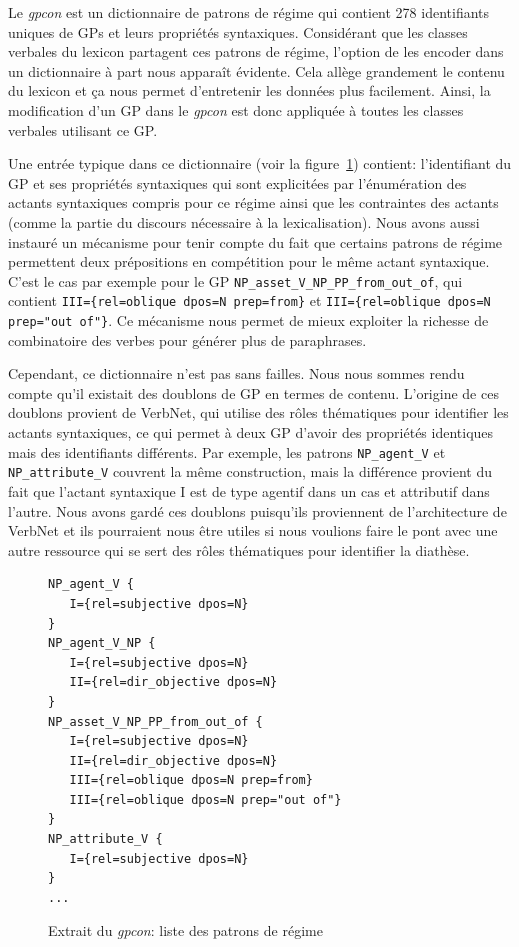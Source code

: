 Le \emph{gpcon} est un dictionnaire de patrons de régime qui contient 278 identifiants uniques de \acp{GP} et leurs propriétés syntaxiques. Considérant que les classes verbales du lexicon partagent ces patrons de régime, l'option de les encoder dans un dictionnaire à part nous apparaît évidente. Cela allège grandement le contenu du lexicon et ça nous permet d'entretenir les données plus facilement. Ainsi, la modification d'un \ac{GP} dans le \emph{gpcon} est donc appliquée à toutes les classes verbales utilisant ce \ac{GP}. 

Une entrée typique dans ce dictionnaire (voir la figure~\ref{fig:4entries-gpcon}) contient: l'identifiant du \ac{GP} et ses propriétés syntaxiques qui sont explicitées par l'énumération des actants syntaxiques compris pour ce régime ainsi que les contraintes des actants (comme la partie du discours nécessaire à la lexicalisation). Nous avons aussi instauré un mécanisme pour tenir compte du fait que certains patrons de régime permettent deux prépositions en compétition pour le même actant syntaxique. C'est le cas par exemple pour le \ac{GP} \texttt{NP\_asset\_V\_NP\_PP\_from\_out\_of}, qui contient \lstinline|III={rel=oblique dpos=N prep=from}| et \lstinline|III={rel=oblique dpos=N prep="out of"}|. Ce mécanisme nous permet de mieux exploiter la richesse de combinatoire des verbes pour générer plus de paraphrases.

Cependant, ce dictionnaire n'est pas sans failles. Nous nous sommes rendu compte qu'il existait des doublons de \ac{GP} en termes de contenu. L'origine de ces doublons provient de VerbNet, qui utilise des rôles thématiques pour identifier les actants syntaxiques, ce qui permet à deux \ac{GP} d'avoir des propriétés identiques mais des identifiants différents. Par exemple, les patrons \texttt{NP\_agent\_V} et \texttt{NP\_attribute\_V} couvrent la même construction, mais la différence provient du fait que l'actant syntaxique I est de type agentif dans un cas et attributif dans l'autre. Nous avons gardé ces doublons puisqu'ils proviennent de l'architecture de VerbNet et ils pourraient nous être utiles si nous voulions faire le pont avec une autre ressource qui se sert des rôles thématiques pour identifier la diathèse.

\begin{figure}[htb]
  \caption{Extrait du \emph{gpcon}: liste des patrons de régime}
	\label{fig:4entries-gpcon}
\begin{lstlisting}[language=mate]
NP_agent_V {
   I={rel=subjective dpos=N}
}
NP_agent_V_NP {
   I={rel=subjective dpos=N}
   II={rel=dir_objective dpos=N}
}
NP_asset_V_NP_PP_from_out_of {
   I={rel=subjective dpos=N}
   II={rel=dir_objective dpos=N}
   III={rel=oblique dpos=N prep=from}
   III={rel=oblique dpos=N prep="out of"}
}
NP_attribute_V {
   I={rel=subjective dpos=N}
}
...
\end{lstlisting}
\end{figure}

